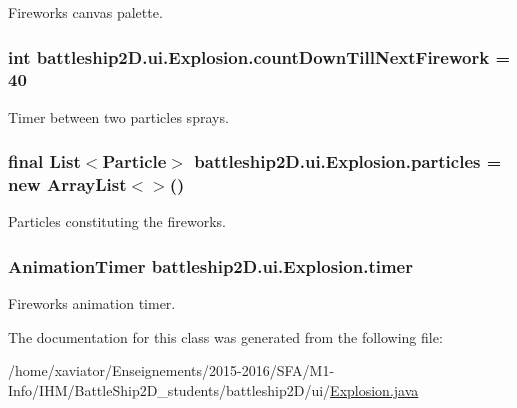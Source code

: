 Fireworks canvas palette. 

\hypertarget{classbattleship2D_1_1ui_1_1Explosion_a5ebd846be63f323f45e95038f9941cb3}{
\subsubsection[{count\-Down\-Till\-Next\-Firework}]{\setlength{\rightskip}{0pt plus 5cm}int battleship2\-D.\-ui.\-Explosion.\-count\-Down\-Till\-Next\-Firework = 40\hspace{0.3cm}{\ttfamily [private]}}}\label{classbattleship2D_1_1ui_1_1Explosion_a5ebd846be63f323f45e95038f9941cb3}


Timer between two particles sprays. 

\hypertarget{classbattleship2D_1_1ui_1_1Explosion_a4433fee8590870ce4f7d23d96efabb39}{
\subsubsection[{particles}]{\setlength{\rightskip}{0pt plus 5cm}final List$<${\bf Particle}$>$ battleship2\-D.\-ui.\-Explosion.\-particles = new Array\-List$<$$>$()\hspace{0.3cm}{\ttfamily [private]}}}\label{classbattleship2D_1_1ui_1_1Explosion_a4433fee8590870ce4f7d23d96efabb39}


Particles constituting the fireworks. 

\hypertarget{classbattleship2D_1_1ui_1_1Explosion_a776b8d79ca23a39ec19567138498baf6}{
\subsubsection[{timer}]{\setlength{\rightskip}{0pt plus 5cm}Animation\-Timer battleship2\-D.\-ui.\-Explosion.\-timer\hspace{0.3cm}{\ttfamily [private]}}}\label{classbattleship2D_1_1ui_1_1Explosion_a776b8d79ca23a39ec19567138498baf6}


Fireworks animation timer. 



The documentation for this class was generated from the following file\-:\begin{DoxyCompactItemize}
\item 
/home/xaviator/\-Enseignements/2015-\/2016/\-S\-F\-A/\-M1-\/\-Info/\-I\-H\-M/\-Battle\-Ship2\-D\-\_\-students/battleship2\-D/ui/\hyperlink{Explosion_8java}{Explosion.\-java}\end{DoxyCompactItemize}
